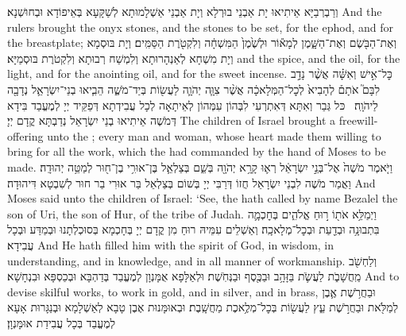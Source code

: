 {וְרַבְרְבַיָּא אֵיתִיאוּ יָת אַבְנֵי בוּרְלָא וְיָת אַבְנֵי אַשְׁלָמוּתָא לְשַׁקָּעָא בְּאֵיפוֹדָא וּבְחוּשְׁנָא׃}
{And the rulers brought the onyx stones, and the stones to be set, for the ephod, and for the breastplate;}{}
{וְאֶת־הַבֹּ֖שֶׂם וְאֶת־הַשָּׁ֑מֶן לְמָא֕וֹר וּלְשֶׁ֙מֶן֙ הַמִּשְׁחָ֔ה וְלִקְטֹ֖רֶת הַסַּמִּֽים׃}
{וְיָת בּוּסְמָא וְיָת מִשְׁחָא לְאַנְהָרוּתָא וְלִמְשַׁח רְבוּתָא וְלִקְטֹרֶת בּוּסְמַיָּא׃}
{and the spice, and the oil, for the light, and for the anointing oil, and for the sweet incense.}{}
{כׇּל־אִ֣ישׁ וְאִשָּׁ֗ה אֲשֶׁ֨ר נָדַ֣ב לִבָּם֮ אֹתָם֒ לְהָבִיא֙ לְכׇל־הַמְּלָאכָ֔ה אֲשֶׁ֨ר צִוָּ֧ה יְהֹוָ֛ה לַעֲשׂ֖וֹת בְּיַד־מֹשֶׁ֑ה הֵבִ֧יאוּ בְנֵי־יִשְׂרָאֵ֛ל נְדָבָ֖ה לַיהֹוָֽה׃ \petucha }
{כּל גְּבַר וְאִתָּא דְּאִתְרְעִי לִבְּהוֹן עִמְּהוֹן לְאֵיתָאָה לְכָל עֲבִידְתָא דְּפַקֵּיד יְיָ לְמֶעֱבַד בִּידָא דְּמֹשֶׁה אֵיתִיאוּ בְנֵי יִשְׂרָאֵל נְדַבְתָּא קֳדָם יְיָ׃}
{The children of Israel brought a freewill-offering unto the \lord; every man and woman, whose heart made them willing to bring for all the work, which the \lord\space had commanded by the hand of Moses to be made.}{}
{וַיֹּ֤אמֶר מֹשֶׁה֙ אֶל־בְּנֵ֣י יִשְׂרָאֵ֔ל רְא֛וּ קָרָ֥א יְהֹוָ֖ה בְּשֵׁ֑ם בְּצַלְאֵ֛ל בֶּן־אוּרִ֥י בֶן־ח֖וּר לְמַטֵּ֥ה יְהוּדָֽה׃
}
{וַאֲמַר מֹשֶׁה לִבְנֵי יִשְׂרָאֵל חֲזוֹ דְּרַבִּי יְיָ בְּשׁוֹם בְּצַלְאֵל בַּר אוּרִי בַר חוּר לְשִׁבְטָא דִּיהוּדָה׃}
{And Moses said unto the children of Israel: ‘See, the \lord\space hath called by name Bezalel the son of Uri, the son of Hur, of the tribe of Judah.}{}
{וַיְמַלֵּ֥א אֹת֖וֹ ר֣וּחַ אֱלֹהִ֑ים בְּחׇכְמָ֛ה בִּתְבוּנָ֥ה וּבְדַ֖עַת וּבְכׇל־מְלָאכָֽה׃}
{וְאַשְׁלֵים עִמֵּיהּ רוּחַ מִן קֳדָם יְיָ בְּחָכְמָא בְּסוּכְלְתָנוּ וּבְמַדַּע וּבְכָל עֲבִידָא׃}
{And He hath filled him with the spirit of God, in wisdom, in understanding, and in knowledge, and in all manner of workmanship.}{}
{וְלַחְשֹׁ֖ב מַֽחֲשָׁבֹ֑ת לַעֲשֹׂ֛ת בַּזָּהָ֥ב וּבַכֶּ֖סֶף וּבַנְּחֹֽשֶׁת׃}
{וּלְאַלָּפָא אֻמָּנְוָן לְמֶעֱבַד בְּדַהְבָּא וּבְכַסְפָּא וּבִנְחָשָׁא׃}
{And to devise skilful works, to work in gold, and in silver, and in brass,}{}
{וּבַחֲרֹ֥שֶׁת אֶ֛בֶן לְמַלֹּ֖את וּבַחֲרֹ֣שֶׁת עֵ֑ץ לַעֲשׂ֖וֹת בְּכׇל־מְלֶ֥אכֶת מַחֲשָֽׁבֶת׃}
{וּבְאוּמָּנוּת אֶבֶן טָבָא לְאַשְׁלָמָא וּבְנַגָּרוּת אָעָא לְמֶעֱבַד בְּכָל עֲבִידַת אוּמָּנְוָן׃}
